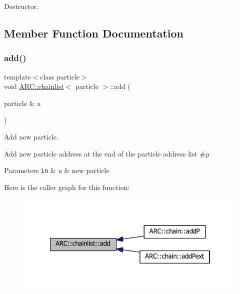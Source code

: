 Destructor. 



\subsection{Member Function Documentation}
\hypertarget{classARC_1_1chainlist_afa780edfa301cc22cf189e63d7a59c2c}{}\label{classARC_1_1chainlist_afa780edfa301cc22cf189e63d7a59c2c} 
\subsubsection{\texorpdfstring{add()}{add()}\hspace{0.1cm}{\footnotesize\ttfamily [1/3]}}
{\footnotesize\ttfamily template$<$class particle$>$ \\
void \hyperlink{classARC_1_1chainlist}{A\+R\+C\+::chainlist}$<$ particle $>$\+::add (\begin{DoxyParamCaption}\item[{particle \&}]{a }\end{DoxyParamCaption})\hspace{0.3cm}{\ttfamily [inline]}}



Add new particle. 

Add new particle address at the end of the particle address list \#p 
\begin{DoxyParams}[1]{Parameters}
\mbox{\tt in}  & {\em a} & new particle \\
\hline
\end{DoxyParams}
Here is the caller graph for this function\+:
\nopagebreak
\begin{figure}[H]
\begin{center}
\leavevmode
\includegraphics[width=322pt]{classARC_1_1chainlist_afa780edfa301cc22cf189e63d7a59c2c_icgraph}
\end{center}
\end{figure}
\hypertarget{classARC_1_1chainlist_a2dba82eb1c3caa32fc76b619c5379da5}{}\label{classARC_1_1chainlist_a2dba82eb1c3caa32fc76b619c5379da5} 
